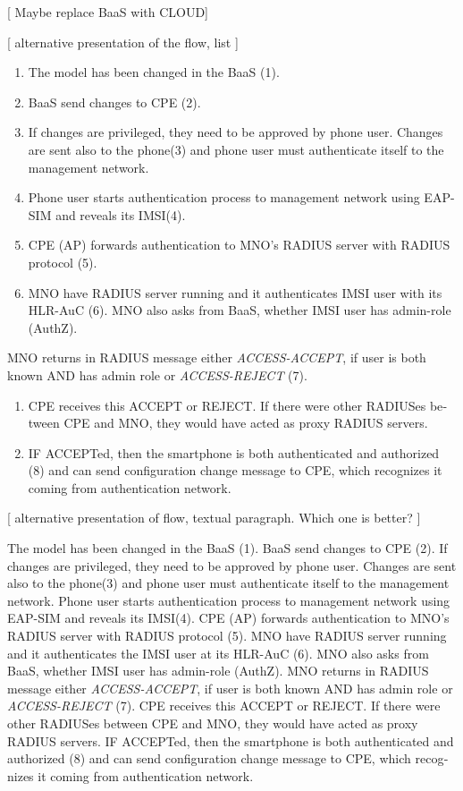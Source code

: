 \documentclass[12pt,a4paper,english]{tutthesis}
\begin{document}
\begin{otherlanguage}{english}
[ Maybe replace BaaS with CLOUD] 


[ alternative presentation of the flow, list ] 

\begin{enumerate}
\item The model has been changed in the BaaS (1).
\item BaaS send changes to CPE (2).
\item If changes are privileged, they need to be approved by phone user.
Changes are sent also to the phone(3) and phone user must authenticate
itself to the management network.
\item Phone user starts authentication process to management
network using EAP-SIM and reveals its IMSI(4).
\item CPE  (AP) forwards authentication to MNO's RADIUS server with
RADIUS protocol (5).
\item MNO have RADIUS server running and it authenticates IMSI user with
  its HLR-AuC (6).
MNO also asks from BaaS, whether IMSI user has admin-role (AuthZ).
\end{enumerate}
MNO returns in RADIUS message either \emph{ACCESS-ACCEPT}, if user is both known AND has admin role 
  or \emph{ACCESS-REJECT} (7).
\begin{enumerate}
\item CPE receives this ACCEPT or REJECT. If there were other RADIUSes
between CPE and MNO, they would have acted
as proxy RADIUS servers.
\item IF ACCEPTed, then the smartphone is both authenticated and authorized (8) and
can send configuration change message to CPE, which recognizes it
coming from authentication network.
\end{enumerate}



[ alternative presentation of flow, textual paragraph. Which one is better? ] 

The model has been changed in the BaaS (1). BaaS send changes to CPE
(2).  If changes are privileged, they need to be approved by phone
user.  Changes are sent also to the phone(3) and phone user must
authenticate itself to the management network.  Phone user starts
authentication process to management network using EAP-SIM and reveals
its IMSI(4).  CPE (AP) forwards authentication to MNO's RADIUS server
with RADIUS protocol (5).  MNO have RADIUS server running and it
authenticates the IMSI user at its HLR-AuC (6). MNO also asks from
BaaS, whether IMSI user has admin-role (AuthZ). 
MNO returns in RADIUS message either \emph{ACCESS-ACCEPT}, if
user is both known AND has admin role or \emph{ACCESS-REJECT} (7).  CPE
receives this ACCEPT or REJECT. If there were other RADIUSes between
CPE and MNO, they would have acted as proxy RADIUS servers.  IF
ACCEPTed, then the smartphone is both authenticated and authorized (8) and can
send configuration change message to CPE, which recognizes it coming
from authentication network.


\end{otherlanguage}
\end{document}
